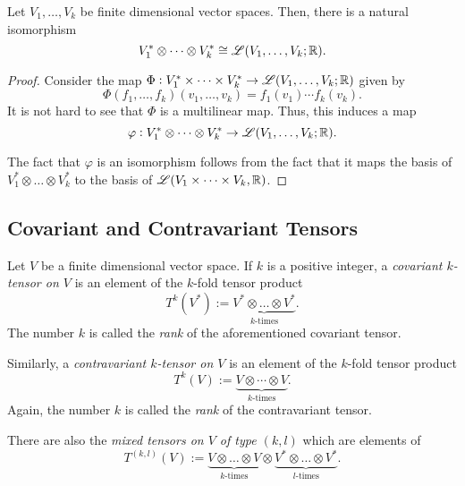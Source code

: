 \begin{theorem}
    Let $V_1,\dots,V_k$ be finite dimensional vector spaces. Then, there is a natural isomorphism 
    \begin{equation*}
        V_1^*\otimes\dots\otimes V_k^*\cong\mathscr L(V_1,\dots,V_k; \mathbb{R}).
    \end{equation*}
\end{theorem}
\begin{proof}
    Consider the map $\Phi: V_1^*\times\dots\times V_k^*\to\mathscr L(V_1,\dots,V_k;\mathbb{R})$ given by 
    \begin{equation*}
        \Phi(f_1,\dots,f_k)(v_1,\dots,v_k) = f_1(v_1)\cdots f_k(v_k).
    \end{equation*}
    It is not hard to see that $\Phi$ is a multilinear map. Thus, this induces a map $$\varphi: V_1^*\otimes\cdots\otimes V_k^*\to\mathscr L(V_1,\dots,V_k;\mathbb{R}).$$ 
    
    The fact that $\varphi$ is an isomorphism follows from the fact that it maps the basis of $V_1^*\otimes\dots\otimes V_k^*$ to the basis of $\mathscr L(V_1\times\dots\times V_k,\mathbb{R})$.
\end{proof}

\subsection{Covariant and Contravariant Tensors}

\begin{definition}
    Let $V$ be a finite dimensional vector space. If $k$ is a positive integer, a \emph{covariant $k$-tensor on $V$} is an element of the $k$-fold tensor product 
    $$T^k(V^*) := \underbrace{V^*\otimes\dots\otimes V^*}_{k\text{-times}}.$$ 
    The number $k$ is called the \emph{rank} of the aforementioned covariant tensor.

    Similarly, a \emph{contravariant $k$-tensor on $V$} is an element of the $k$-fold tensor product 
    $$T^k(V) := \underbrace{V\otimes\cdots\otimes V}_{k\text{-times}}.$$ 
    Again, the number $k$ is called the \emph{rank} of the contravariant tensor.

    There are also the \emph{mixed tensors on $V$ of type $(k,l)$} which are elements of 
    \begin{equation*}
        T^{(k,l)}(V) := \underbrace{V\otimes\dots\otimes V}_{k\text{-times}}\otimes\underbrace{V^*\otimes\dots\otimes V^*}_{l\text{-times}}.
    \end{equation*}
\end{definition}

